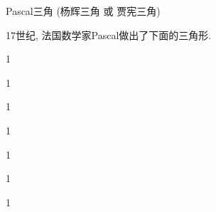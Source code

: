 \documentclass[punct]{ctexbeamer}
\begin{document}
\begin{frame}{Pascal三角  (杨辉三角 或 贾宪三角)}
\begin{center}
\begin{minipage}{0.5\linewidth}
    17世纪, 法国数学家Pascal做出了下面的三角形.
    \begin{table}[]
        \begin{center}
            1

            1 

            1\quad	{}\quad	{}

            1\quad	{}\quad{}\quad{}

            1\quad	{} \quad{}\quad{}\quad {}

            1\quad{}\quad{}\quad{}\quad{}\quad\quad	1

            1\quad{}\quad{}\quad{}\quad{}\quad{}\quad{}


\end{center}
\end{table}
\end{minipage}
\end{center}
\end{frame}
\end{document}
